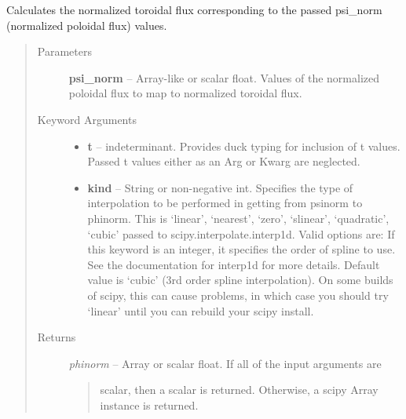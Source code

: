 \documentclass[letterpaper,10pt,english]{sphinxmanual}
\begin{document}
\begin{fulllineitems}
\begin{fulllineitems}
\end{fulllineitems}


\begin{fulllineitems}
\label{eqtools:eqtools.eqdskreader.EqdskReader.psinorm2phinorm}
Calculates the normalized toroidal flux corresponding to the passed psi\_norm (normalized poloidal flux) values.
\begin{quote}\begin{description}
\item[{Parameters}] \leavevmode
\textbf{psi\_norm} --
Array-like or scalar float.
Values of the normalized
poloidal flux to map to normalized toroidal flux.

\item[{Keyword Arguments}] \leavevmode\begin{itemize}
\item {} 
\textbf{t} --
indeterminant.
Provides duck typing for inclusion of t values. Passed t values
either as an Arg or Kwarg are neglected.

\item {} 
\textbf{kind} --
String or non-negative int.
Specifies the type of interpolation
to be performed in getting from psinorm to phinorm. This is
`linear', `nearest', `zero', `slinear', `quadratic', `cubic'
passed to scipy.interpolate.interp1d. Valid options are:
If this keyword is an integer, it specifies the order of spline
to use. See the documentation for interp1d for more details.
Default value is `cubic' (3rd order spline interpolation). On
some builds of scipy, this can cause problems, in which case
you should try `linear' until you can rebuild your scipy install.

\end{itemize}

\item[{Returns}] \leavevmode

\emph{phinorm} --
Array or scalar float. If all of the input arguments are
\begin{quote}

scalar, then a scalar is returned. Otherwise, a scipy Array
instance is returned.
\end{quote}


\end{description}\end{quote}

\end{fulllineitems}
\end{fulllineitems}
\end{document}
